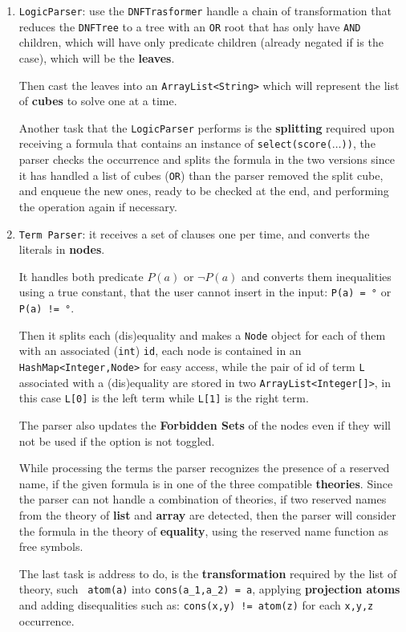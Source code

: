 \documentclass[11pt,a4paper]{article}
\begin{document}
\begin{enumerate}
        \item \texttt{LogicParser}: use the \texttt{DNFTrasformer} handle a chain of transformation that reduces the \texttt{DNFTree} to a tree with an \texttt{OR} root that has only have \texttt{AND} children, which will have only predicate children (already negated if is the case), which will be the \textbf{leaves}.

        Then cast the leaves into an \texttt{ArrayList<String>} which will represent the list of \textbf{cubes} to solve one at a time.

        Another task that the \texttt{LogicParser} performs is the \textbf{splitting} required upon receiving a formula that contains an instance of \texttt{select(score($\dots$))}, the parser checks the occurrence and splits the formula in the two versions since it has handled a list of cubes (\texttt{OR}) than the parser removed the split cube, and enqueue the new ones, ready to be checked at the end, and performing the operation again if necessary.

        \item \texttt{Term Parser}: it receives a set of clauses one per time, and converts the literals in \textbf{nodes}.

        It handles both predicate $P(a)$ or $\lnot P(a)$ and converts them inequalities using a true constant, that the user cannot insert in the input: \texttt{P(a) = °} or \texttt{P(a) != °}.

        Then it splits each (dis)equality and makes a \texttt{Node} object for each of them with an associated (\texttt{int}) \texttt{id}, each node is contained in an \texttt{HashMap<Integer,Node>} for easy access, while the pair of id of term \texttt{L} associated with a (dis)equality are stored in two \texttt{ArrayList<Integer[]>}, in this case \texttt{L[0]} is the left term while \texttt{L[1]} is the right term. 
        
        The parser also updates the \textbf{Forbidden Sets} of the nodes even if they will not be used if the option is not toggled.

        While processing the terms the parser recognizes the presence of a reserved name, if the given formula is in one of the three compatible \textbf{theories}. Since the parser can not handle a combination of theories, if two reserved names from the theory of \textbf{list} and \textbf{array} are detected, then the parser will consider the formula in the theory of \textbf{equality}, using the reserved name function as free symbols.
        
        The last task is address to do, is the \textbf{transformation} required by the list of theory, such \texttt{~atom(a)} into \texttt{cons(a\_1,a\_2) = a}, applying \textbf{projection atoms} and adding disequalities such as: \texttt{cons(x,y) != atom(z)} for each \texttt{x,y,z} occurrence. 

    \end{enumerate}
\end{document}
